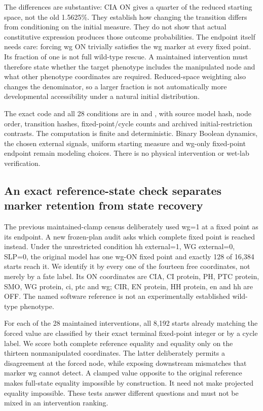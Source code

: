 The differences are substantive: CIA ON gives a quarter of the reduced starting space, not the old 1.5625\%. They establish how changing the transition differs from conditioning on the initial measure. They do not show that actual constitutive expression produces those outcome probabilities. The endpoint itself needs care: forcing wg ON trivially satisfies the wg marker at every fixed point. Its fraction of one is not full wild-type rescue. A maintained intervention must therefore state whether the target phenotype includes the manipulated node and what other phenotype coordinates are required. Reduced-space weighting also changes the denominator, so a larger fraction is not automatically more developmental accessibility under a natural initial distribution.

The exact code and all 28 conditions are in  and , with source model hash, node order, transition hashes, fixed-point/cycle counts and archived initial-restriction contrasts. The computation is finite and deterministic. Binary Boolean dynamics, the chosen external signals, uniform starting measure and wg-only fixed-point endpoint remain modeling choices. There is no physical intervention or wet-lab verification.

\subsection{An exact reference-state check separates marker retention from state recovery}
The previous maintained-clamp census deliberately used wg=1 at a fixed point as its endpoint. A new frozen-plan audit asks which complete fixed point is reached instead. Under the unrestricted condition hh external=1, WG external=0, SLP=0, the original model has one wg-ON fixed point and exactly 128 of 16,384 starts reach it. We identify it by every one of the fourteen free coordinates, not merely by a fate label. Its ON coordinates are CIA, CI protein, PH, PTC protein, SMO, WG protein, ci, ptc and wg; CIR, EN protein, HH protein, en and hh are OFF. The named software reference is not an experimentally established wild-type phenotype.

For each of the 28 maintained interventions, all 8,192 starts already matching the forced value are classified by their exact terminal fixed-point integer or by a cycle label. We score both complete reference equality and equality only on the thirteen nonmanipulated coordinates. The latter deliberately permits a disagreement at the forced node, while exposing downstream mismatches that marker wg cannot detect. A clamped value opposite to the original reference makes full-state equality impossible by construction. It need not make projected equality impossible. These tests answer different questions and must not be mixed in an intervention ranking.

